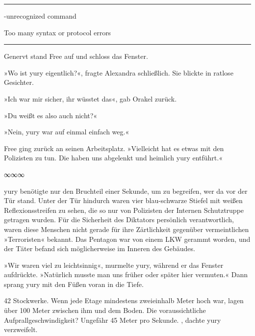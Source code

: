 \noindent \parbox{\textwidth}{ \vspace{3ex} \hrule \vspace{3ex}

    \begin{tiny}
    \begin{ttfamily}

-unrecognized command

 Too many syntax or protocol errors

    \end{ttfamily}
    \end{tiny}

\vspace{3ex} \hrule \vspace{3ex} }

Genervt stand Free auf und schloss das Fenster.

»Wo ist yury eigentlich?«, fragte Alexandra schließlich. Sie blickte in ratlose Gesichter.

»Ich war mir sicher, ihr wüsstet das«, gab Orakel zurück.

»Du weißt es also auch nicht?«

»Nein, yury war auf einmal einfach weg.«

Free ging zurück an seinen Arbeitsplatz. »Vielleicht hat es etwas mit den Polizisten zu tun. Die haben uns abgelenkt und heimlich yury entführt.«

\begin{center}
	∞∞∞
\end{center}

yury benötigte nur den Bruchteil einer Sekunde, um zu begreifen, wer da vor der Tür stand. Unter der Tür hindurch waren vier blau-schwarze Stiefel mit weißen Reflexionsstreifen zu sehen, die so nur von Polizisten der Internen Schutztruppe getragen wurden. Für die Sicherheit des Diktators persönlich verantwortlich, waren diese Menschen nicht gerade für ihre Zärtlichkeit gegenüber vermeintlichen »Terroristen« bekannt. Das Pentagon war von einem LKW gerammt worden, und der Täter befand sich möglicherweise im Inneren des Gebäudes.

»Wir waren viel zu leichtsinnig«, murmelte yury, während er das Fenster aufdrückte. »Natürlich musste man uns früher oder später hier vermuten.« Dann sprang yury mit den Füßen voran in die Tiefe.

42 Stockwerke. Wenn jede Etage mindestens zweieinhalb Meter hoch war, lagen über 100 Meter zwischen ihm und dem Boden. Die voraussichtliche Aufprallgeschwindigkeit? Ungefähr 45 Meter pro Sekunde. , dachte yury verzweifelt. 


